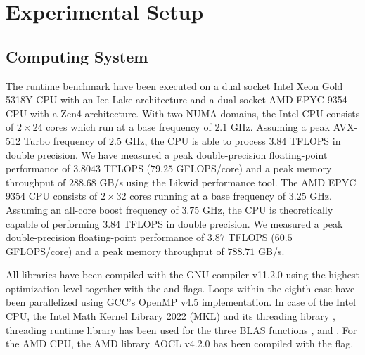 \section{Experimental Setup}
\label{sec:experimental.setup}

\begin{table*}[t]

\caption%
{%
\footnotesize
Tensor shape sets and example dimension tuples that are used in our runtime benchmarking.
The first $4$ shape sets $N_1$, $N_2$, $N_3$ and $N_{10}$ are used to generate asymmetrically shaped tensors, each consisting of $72$ dimension tuples.
Shape set $M$ contains $48$ tensor shapes that are used to generate symmetrically shaped tensors.
Shape set $Q$ contains $8$ tensor shapes that are part of SDRBench \cite{zhao:2020:sdrbench}.
Note that all matrix shapes depend on the input tensor shapes and contraction mode.
}
\label{tab:dataset}
\end{table*}



\subsection{Computing System} 
The runtime benchmark have been executed on a dual socket Intel Xeon Gold 5318Y CPU with an Ice Lake architecture and a dual socket AMD EPYC 9354 CPU with a Zen4 architecture.
With two NUMA domains, the Intel CPU consists of $2\times24$ cores which run at a base frequency of $2.1$ GHz.
Assuming a peak AVX-512 Turbo frequency of $2.5$ GHz, the CPU is able to process $3.84$ TFLOPS in double precision.
We have measured a peak double-precision floating-point performance of $3.8043$ TFLOPS ($79.25$ GFLOPS/core) and a peak memory throughput of $288.68$ GB/s using the Likwid performance tool.
The AMD EPYC 9354 CPU consists of $2\times32$ cores running at a base frequency of $3.25$ GHz.
Assuming an all-core boost frequency of $3.75$ GHz, the CPU is theoretically capable of performing $3.84$ TFLOPS in double precision.
We measured a peak double-precision floating-point performance of $3.87$ TFLOPS ($60.5$ GFLOPS/core) and a peak memory throughput of $788.71$ GB/s.
 
All libraries have been compiled with the GNU compiler v11.2.0 using the highest optimization level  together with the  and  flags. 
Loops within the eighth case have been parallelized using GCC's OpenMP v4.5 implementation.
In case of the Intel CPU, the Intel Math Kernel Library 2022 (MKL) and its threading library , threading runtime library  has been used for the three BLAS functions ,  and .
For the AMD CPU, the AMD library AOCL v4.2.0 has been compiled with the  flag.


